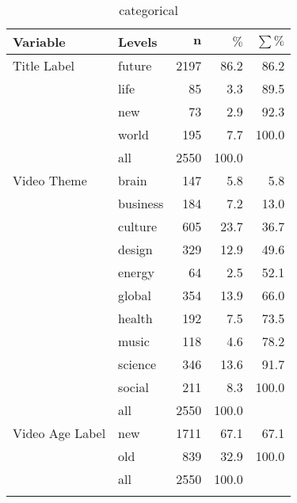 \begingroup\footnotesize
\begin{longtable}{ll|rrr}
 \textbf{Variable} & \textbf{Levels} & $\mathbf{n}$ & $\mathbf{\%}$ & $\mathbf{\sum \%}$ \\ 
  \hline
Title Label & future & 2197 & 86.2 & 86.2 \\ 
   & life & 85 & 3.3 & 89.5 \\ 
   & new & 73 & 2.9 & 92.3 \\ 
   & world & 195 & 7.7 & 100.0 \\ 
   \hline
 & all & 2550 & 100.0 &  \\ 
   \hline
\hline
Video Theme & brain & 147 & 5.8 & 5.8 \\ 
   & business & 184 & 7.2 & 13.0 \\ 
   & culture & 605 & 23.7 & 36.7 \\ 
   & design & 329 & 12.9 & 49.6 \\ 
   & energy & 64 & 2.5 & 52.1 \\ 
   & global & 354 & 13.9 & 66.0 \\ 
   & health & 192 & 7.5 & 73.5 \\ 
   & music & 118 & 4.6 & 78.2 \\ 
   & science & 346 & 13.6 & 91.7 \\ 
   & social & 211 & 8.3 & 100.0 \\ 
   \hline
 & all & 2550 & 100.0 &  \\ 
   \hline
\hline
Video Age Label & new & 1711 & 67.1 & 67.1 \\ 
   & old & 839 & 32.9 & 100.0 \\ 
   \hline
 & all & 2550 & 100.0 &  \\ 
   \hline
\hline
\hline
\caption{categorical} 
\label{cat}
\end{longtable}
\endgroup
